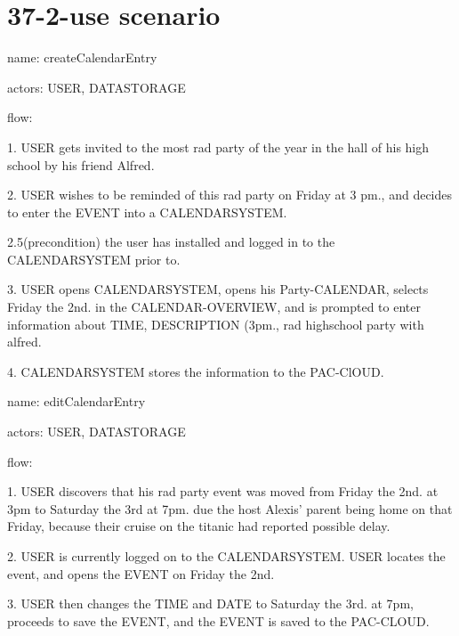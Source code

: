 \section{37-2-use scenario}
name: createCalendarEntry

actors: USER, DATASTORAGE

flow: 

1. USER gets invited to the most rad party of the year in the hall of his high school by his friend Alfred.

2. USER wishes to be reminded of this rad party on Friday at 3 pm., and decides to enter the EVENT into a CALENDARSYSTEM.

2.5(precondition) the user has installed and logged in to the CALENDARSYSTEM prior to.

3. USER opens CALENDARSYSTEM, opens his Party-CALENDAR, selects Friday the 2nd. in the CALENDAR-OVERVIEW, and is prompted to enter information about TIME, DESCRIPTION (3pm., rad highschool party with alfred.

4. CALENDARSYSTEM stores the information to the PAC-ClOUD.


name: editCalendarEntry

actors: USER, DATASTORAGE

flow:

1. USER discovers that his rad party event was moved from Friday the 2nd. at 3pm to Saturday the 3rd at 7pm. due the host Alexis' parent being home on that Friday, because their cruise on the titanic had reported possible delay.

2. USER is currently logged on to the CALENDARSYSTEM. USER locates the event, and opens the EVENT on Friday the 2nd.

3. USER then changes the TIME and DATE to Saturday the 3rd. at 7pm, proceeds to save the EVENT, and the EVENT is saved to the PAC-CLOUD.

